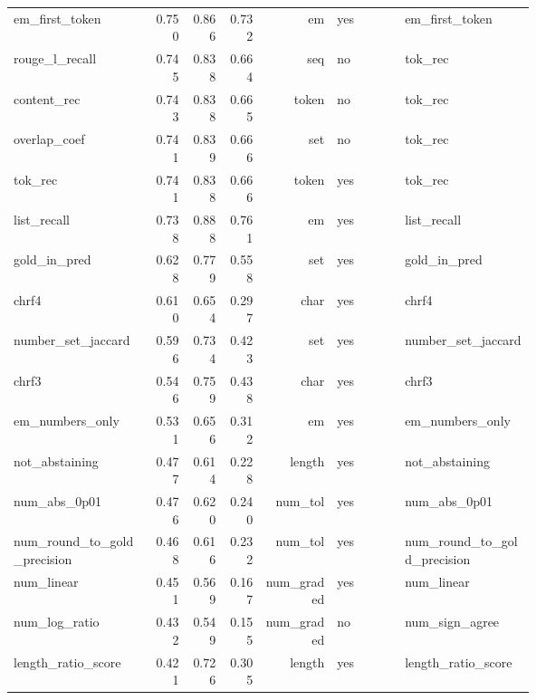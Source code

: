 \begin{longtable}{p{0.278\linewidth}rrrrp{0.134\linewidth}p{0.259\linewidth}}
em\_\allowbreak{}first\_\allowbreak{}token & 0.750 & 0.866 & 0.732 & em & yes & em\_\allowbreak{}first\_\allowbreak{}token \\
rouge\_\allowbreak{}l\_\allowbreak{}recall & 0.745 & 0.838 & 0.664 & seq & no & tok\_\allowbreak{}rec \\
content\_\allowbreak{}rec & 0.743 & 0.838 & 0.665 & token & no & tok\_\allowbreak{}rec \\
overlap\_\allowbreak{}coef & 0.741 & 0.839 & 0.666 & set & no & tok\_\allowbreak{}rec \\
tok\_\allowbreak{}rec & 0.741 & 0.838 & 0.666 & token & yes & tok\_\allowbreak{}rec \\
list\_\allowbreak{}recall & 0.738 & 0.888 & 0.761 & em & yes & list\_\allowbreak{}recall \\
gold\_\allowbreak{}in\_\allowbreak{}pred & 0.628 & 0.779 & 0.558 & set & yes & gold\_\allowbreak{}in\_\allowbreak{}pred \\
chrf4 & 0.610 & 0.654 & 0.297 & char & yes & chrf4 \\
number\_\allowbreak{}set\_\allowbreak{}jaccard & 0.596 & 0.734 & 0.423 & set & yes & number\_\allowbreak{}set\_\allowbreak{}jaccard \\
chrf3 & 0.546 & 0.759 & 0.438 & char & yes & chrf3 \\
em\_\allowbreak{}numbers\_\allowbreak{}only & 0.531 & 0.656 & 0.312 & em & yes & em\_\allowbreak{}numbers\_\allowbreak{}only \\
not\_\allowbreak{}abstaining & 0.477 & 0.614 & 0.228 & length & yes & not\_\allowbreak{}abstaining \\
num\_\allowbreak{}abs\_\allowbreak{}0p01 & 0.476 & 0.620 & 0.240 & num\_\allowbreak{}tol & yes & num\_\allowbreak{}abs\_\allowbreak{}0p01 \\
num\_\allowbreak{}round\_\allowbreak{}to\_\allowbreak{}gold\_\allowbreak{}precision & 0.468 & 0.616 & 0.232 & num\_\allowbreak{}tol & yes & num\_\allowbreak{}round\_\allowbreak{}to\_\allowbreak{}gold\_\allowbreak{}precision \\
num\_\allowbreak{}linear & 0.451 & 0.569 & 0.167 & num\_\allowbreak{}graded & yes & num\_\allowbreak{}linear \\
num\_\allowbreak{}log\_\allowbreak{}ratio & 0.432 & 0.549 & 0.155 & num\_\allowbreak{}graded & no & num\_\allowbreak{}sign\_\allowbreak{}agree \\
length\_\allowbreak{}ratio\_\allowbreak{}score & 0.421 & 0.726 & 0.305 & length & yes & length\_\allowbreak{}ratio\_\allowbreak{}score \\

\end{longtable}

